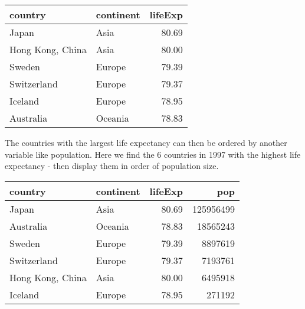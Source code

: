 \documentclass[]{book}
\newenvironment{Shaded}{\begin{snugshade}}{\end{snugshade}}
\newcommand{\KeywordTok}[1]{\textcolor[rgb]{0.13,0.29,0.53}{\textbf{#1}}}
\newcommand{\DataTypeTok}[1]{\textcolor[rgb]{0.13,0.29,0.53}{#1}}
\newcommand{\DecValTok}[1]{\textcolor[rgb]{0.00,0.00,0.81}{#1}}
\newcommand{\StringTok}[1]{\textcolor[rgb]{0.31,0.60,0.02}{#1}}
\newcommand{\OperatorTok}[1]{\textcolor[rgb]{0.81,0.36,0.00}{\textbf{#1}}}
\newcommand{\NormalTok}[1]{#1}
\begin{document}
\begin{tabular}{l|l|r}
\hline
country & continent & lifeExp\\
\hline
Japan & Asia & 80.69\\
\hline
Hong Kong, China & Asia & 80.00\\
\hline
Sweden & Europe & 79.39\\
\hline
Switzerland & Europe & 79.37\\
\hline
Iceland & Europe & 78.95\\
\hline
Australia & Oceania & 78.83\\
\hline
\end{tabular}

The countries with the largest life expectancy can then be ordered by
another variable like population. Here we find the 6 countries in 1997
with the highest life expectancy - then display them in order of
population size.

\begin{Shaded}
\end{Shaded}

\begin{tabular}{l|l|r|r}
\hline
country & continent & lifeExp & pop\\
\hline
Japan & Asia & 80.69 & 125956499\\
\hline
Australia & Oceania & 78.83 & 18565243\\
\hline
Sweden & Europe & 79.39 & 8897619\\
\hline
Switzerland & Europe & 79.37 & 7193761\\
\hline
Hong Kong, China & Asia & 80.00 & 6495918\\
\hline
Iceland & Europe & 78.95 & 271192\\
\hline
\end{tabular}
\end{document}
